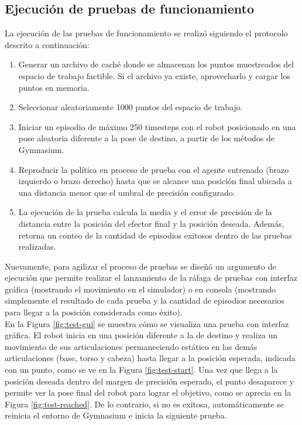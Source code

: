 \subsection{Ejecución de pruebas de funcionamiento}

La ejecución de las pruebas de funcionamiento se realizó siguiendo el protocolo descrito a continuación:

\begin{enumerate}
	\item Generar un archivo de caché donde se almacenan los puntos muestreados del espacio de trabajo factible. Si el archivo ya existe, aprovecharlo y cargar los puntos en memoria.
	
	\item Seleccionar aleatoriamente 1000 puntos del espacio de trabajo.
	
	\item Iniciar un episodio de máximo 250 timesteps con el robot posicionado en una pose aleatoria diferente a la pose de destino, a partir de los métodos de Gymnasium.
	
	\item Reproducir la política en proceso de prueba con el agente entrenado (brazo izquierdo o brazo derecho) hasta que se alcance una posición final ubicada a una distancia menor que el umbral de precisión configurado.
	
	\item La ejecución de la prueba calcula la media y el error de precisión de la distancia entre la posición del efector final y la posición deseada. Además, retorna un conteo de la cantidad de episodios exitosos dentro de las pruebas realizadas.
\end{enumerate}

Nuevamente, para agilizar el proceso de pruebas se diseñó un argumento de ejecución que permite realizar el lanzamiento de la ráfaga de pruebas con interfaz gráfica (mostrando el movimiento en el simulador) o en consola (mostrando simplemente el resultado de cada prueba y la cantidad de episodios necesarios para llegar a la posición considerada como éxito).\\

En la Figura \ref{fig:test-gui} se muestra cómo se visualiza una prueba con interfaz gráfica. El robot inicia en una posición diferente a la de destino y realiza un movimiento de sus articulaciones permaneciendo estático en las demás articulaciones (base, torso y cabeza) hasta llegar a la posición esperada, indicada con un punto, como se ve en la Figura \ref{fig:test-start}. Una vez que llega a la posición deseada dentro del margen de precisión esperado, el punto desaparece y permite ver la pose final del robot para lograr el objetivo, como se aprecia en la Figura \ref{fig:test-reached}. De lo contrario, si no es exitosa, automáticamente se reinicia el entorno de Gymnasium e inicia la siguiente prueba.


